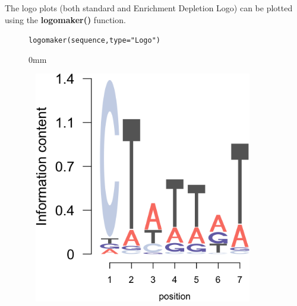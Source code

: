 \documentclass[12pt]{article}\usepackage[]{graphicx}\usepackage[usenames,dvipsnames]{color}
\newcommand{\hlstr}[1]{\textcolor[rgb]{0.251,0.627,0.251}{#1}}%
\newcommand{\hlstd}[1]{\textcolor[rgb]{0.251,0.251,0.251}{#1}}%
\newcommand{\hlkwc}[1]{\textcolor[rgb]{0.251,0.251,0.251}{#1}}%
\newcommand{\hlkwd}[1]{\textcolor[rgb]{0.878,0.439,0.125}{#1}}%
\newenvironment{knitrout}{}{} %
\begin{document}
The logo plots (both standard and Enrichment Depletion Logo) can be plotted using the
\textbf{logomaker()} function.

\begin{figure}[h]
\begin{center}
\begin{knitrout}
\color{fgcolor}\begin{kframe}
\begin{alltt}
\hlkwd{logomaker}\hlstd{(sequence,} \hlkwc{type} \hlstd{=} \hlstr{"Logo"}\hlstd{)}
\end{alltt}
\end{kframe}\begin{adjustwidth}{\fltoffset}{0mm}

\includegraphics[width=4in,height=4in]{figure/standard_logo-1} \hfill{}

\end{adjustwidth}
\end{knitrout}
\end{center}
\end{figure}
\end{document}
